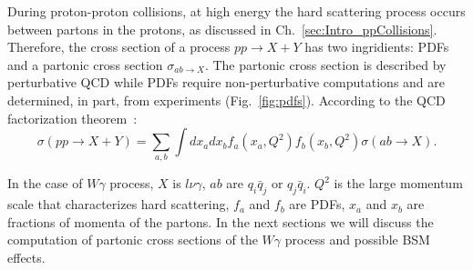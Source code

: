During proton-proton collisions, at high energy the hard scattering process occurs between partons in the protons, as discussed in Ch.~\ref{sec:Intro_ppCollisions}. Therefore, the cross section of a process $pp \rightarrow X+Y$ has two ingridients: PDFs and a partonic cross section $\sigma_{ab\rightarrow X}$. The partonic cross section is described by perturbative QCD while PDFs require non-perturbative computations and are determined, in part, from experiments (Fig.~\ref{fig:pdfs}). According to the QCD factorization theorem~\cite{ref_HardScattering}:\\

\begin{equation}\label{eq:ppCS_general}
  \sigma(pp \rightarrow X+Y)= \sum_{a,b} \int dx_a dx_b f_a(x_a,Q^2) f_b(x_b, Q^2) \sigma(ab \rightarrow X).
\end{equation}

In the case of $W\gamma$ process, $X$ is $l \nu \gamma$, $ab$ are $q_i \bar{q}_j$ or $q_j \bar{q}_i$. $Q^2$ is the large momentum scale that characterizes hard scattering, $f_a$ and $f_b$ are PDFs, $x_a$ and $x_b$ are fractions of momenta of the partons. In the next sections we will discuss the computation of partonic cross sections of the $W\gamma$ process and possible BSM effects.\\

